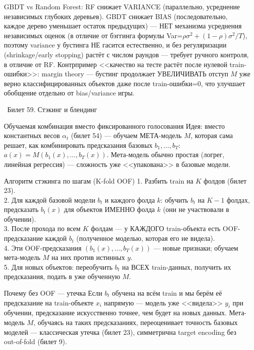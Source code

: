\documentclass[12pt, a4paper]{article}
\newcommand{\bilet}[2]{%
  \vspace{10pt}%
  \noindent\colorbox{qcolor}{\parbox{\dimexpr\linewidth-2\fboxsep\relax}{%
    \color{white}\large\bfseries\strut\ Билет #1. #2%
  }}%
  \nopagebreak\vspace{5pt}\par\nopagebreak%
}
\begin{document}
\begin{fishkabox}
GBDT vs Random Forest: RF снижает VARIANCE (параллельно, усреднение независимых глубоких деревьев). GBDT снижает BIAS (последовательно, каждое дерево уменьшает остаток предыдущих) --- НЕТ механизма усреднения независимых оценок (в отличие от бэггинга формулы Var=$\rho\sigma^2+(1-\rho)\sigma^2/T$), поэтому variance у бустинга НЕ гасится естественно, и без регуляризации (shrinkage/early stopping) растёт с числом раундов --- требует ручного контроля, в отличие от RF.
Контрпример <<качество на тесте растёт после нулевой train-ошибки>>: margin theory --- бустинг продолжает УВЕЛИЧИВАТЬ отступ $M$ уже верно классифицированных объектов даже после train-ошибки=0, что улучшает обобщение отдельно от bias/variance игры.
\end{fishkabox}

\bilet{59}{Стэкинг и блендинг}

\begin{defbox}{Обучаемая комбинация вместо фиксированного голосования}
Идея: вместо константных весов $\alpha_t$ (билет 54) --- обучаем МЕТА-модель $M$, которая сама решает, как комбинировать предсказания базовых $b_1,\ldots,b_T$: $a(x) = M(b_1(x),\ldots,b_T(x))$. Мета-модель обычно простая (логрег, линейная регрессия) --- сложность уже <<упакована>> в базовые модели.
\end{defbox}

\begin{proofbox}{Алгоритм стэкинга по шагам (K-fold OOF)}
1. Разбить train на $K$ фолдов (билет 23).\\
2. Для каждой базовой модели $b_t$ и каждого фолда $k$: обучить $b_t$ на $K{-}1$ фолдах, предсказать $b_t(x)$ для объектов ИМЕННО фолда $k$ (они не участвовали в обучении).\\
3. После прохода по всем $K$ фолдам --- у КАЖДОГО train-объекта есть OOF-предсказание каждой $b_t$ (полученное моделью, которая его не видела).\\
4. Эти OOF-предсказания $(b_1(x),\ldots,b_T(x))$ --- новые признаки; обучаем мета-модель $M$ на них против истинных $y$.\\
5. Для новых объектов: переобучить $b_t$ на ВСЕХ train-данных, получить их предсказания, подать в уже обученную $M$.
\end{proofbox}

\begin{exbox}{Почему без OOF --- утечка}
Если $b_t$ обучена на всём train и мы берём её предсказание на train-объекте $x_i$ напрямую --- модель уже <<видела>> $y_i$ при обучении, предсказание искусственно точнее, чем будет на новых данных. Мета-модель $M$, обучаясь на таких предсказаниях, переоценивает точность базовых моделей --- классическая утечка (билет 23), симметрична target encoding без out-of-fold (билет 9).
\end{exbox}
\end{document}
